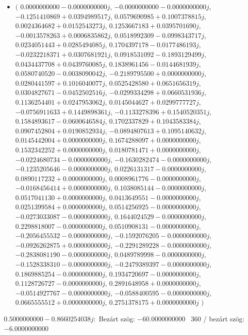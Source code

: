 \documentclass[14pt,a4paper]{article}
\begin{document}
\begin{itemize}
\item
$\big($
$0.0000000000-0.0000000000j$, $-0.0000000000-0.0000000000j$, $-0.1251410869+0.0394989517j$, $0.0579690985+0.1007378815j$, $0.0024364682+0.0152543273j$, $0.1253667183+0.0395701690j$, $-0.0013578263+0.0006835862j$, $0.0518992309-0.0998343717j$, $0.0234051443+0.0285494085j$, $0.1704397178-0.0177486193j$, $-0.0232218371+0.0307681921j$, $0.0918531092-0.1893129499j$, $0.0434437708+0.0439760085j$, $0.1838961456-0.0144681939j$, $0.0580740520-0.0038090042j$, $-0.2189795500+0.0000000000j$, $0.0280441597+0.1016040077j$, $0.0525428580+0.0651656319j$, $0.0304827671-0.0452502516j$, $-0.0299334298+0.0660531936j$, $0.1136254401+0.0247953062j$, $0.0145044627+0.0299777727j$, $-0.0756911633+0.1449898361j$, $-0.1133278396+0.1540520351j$, $0.1584893617-0.0600646584j$, $0.1702337829+0.1043583384j$, $0.0907452804+0.0190852934j$, $-0.0894807613+0.1095140632j$, $0.0145442004+0.0000000000j$, $0.1674288097+0.0000000000j$, $0.1532342252+0.0000000000j$, $0.0180781471+0.0000000000j$, $-0.0224680734-0.0000000000j$, $-0.1630282474-0.0000000000j$, $-0.1235205646-0.0000000000j$, $0.0226131317-0.0000000000j$, $0.0890117232+0.0000000000j$, $0.0008961776-0.0000000000j$, $-0.0168456414+0.0000000000j$, $0.1038085144-0.0000000000j$, $0.0517041130+0.0000000000j$, $0.0413649551-0.0000000000j$, $0.0251399584+0.0000000000j$, $0.0514256925-0.0000000000j$, $-0.0273033087-0.0000000000j$, $0.1644024529-0.0000000000j$, $0.2298818007-0.0000000000j$, $0.0510908131-0.0000000000j$, $-0.2056455532-0.0000000000j$, $-0.1592076205-0.0000000000j$, $-0.0926262875+0.0000000000j$, $-0.2291289228-0.0000000000j$, $-0.2838081190-0.0000000000j$, $0.0489789998-0.0000000000j$, $-0.1528338310-0.0000000000j$, $-0.2479389397-0.0000000000j$, $0.1869885254-0.0000000000j$, $0.1934720697-0.0000000000j$, $0.1128726727-0.0000000000j$, $0.2891648958+0.0000000000j$, $-0.0514927767-0.0000000000j$, $-0.0588400595-0.0000000000j$, $0.0665555512+0.0000000000j$, $0.2751378175+0.0000000000j$
$\big)$
\end{itemize}
$0.5000000000-0.8660254038j$:\
Bezárt szög: $-60.0000000000$ \
360 / bezárt szög: $-6.0000000000$\
\end{document}
